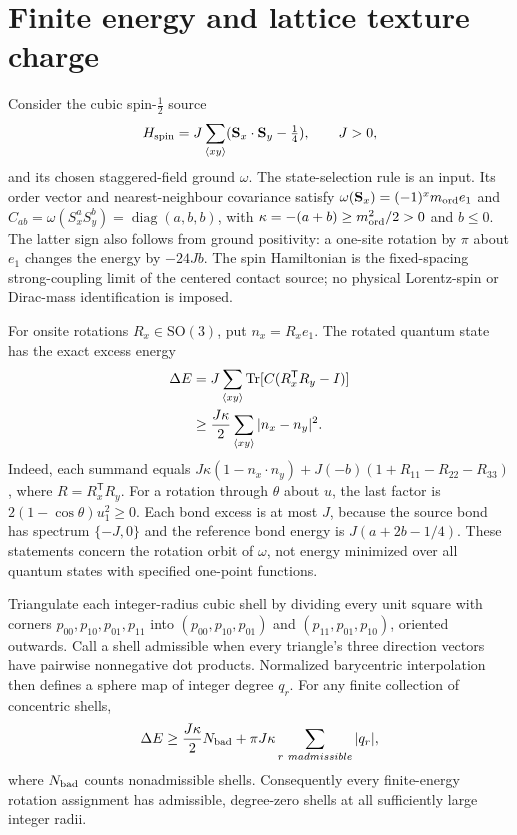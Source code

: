 \section{Finite energy and lattice texture charge}
\label{sec:lattice-texture-finite-energy}

Consider the cubic spin-$\tfrac12$ source
\[
 H_{\rm spin}=J\sum_{\langle xy\rangle}
 (\mathbf S_x\cdot\mathbf S_y-\tfrac14),\qquad J>0,
\]
and its chosen staggered-field ground $\omega$. The state-selection rule
is an input. Its order vector and nearest-neighbour covariance satisfy
$\omega(\mathbf S_x)=(-1)^x m_{\rm ord}e_1$ and
$C_{ab}=\omega(S_x^aS_y^b)=\operatorname{diag}(a,b,b)$, with
$\kappa=-(a+b)\geq m_{\rm ord}^2/2>0$ and $b\leq0$.
The latter sign also follows from ground positivity: a one-site rotation
by $\pi$ about $e_1$ changes the energy by $-24Jb$.
The spin Hamiltonian is the fixed-spacing strong-coupling limit of the
centered contact source; no physical Lorentz-spin or Dirac-mass
identification is imposed.

For onsite rotations $R_x\in\mathrm{SO}(3)$, put $n_x=R_xe_1$.
The rotated quantum state has the exact excess energy
\begin{align}
 \Delta E
 &=J\sum_{\langle xy\rangle}\operatorname{Tr}
       [C(R_x^{\mathsf T}R_y-I)] \notag\\
 &\geq \frac{J\kappa}{2}
       \sum_{\langle xy\rangle}|n_x-n_y|^2.
 \label{eq:lattice-texture-source-bound}
\end{align}
Indeed, each summand equals
$J\kappa(1-n_x\cdot n_y)+J(-b)(1+R_{11}-R_{22}-R_{33})$,
where $R=R_x^{\mathsf T}R_y$.
For a rotation through $\theta$ about $u$, the last factor is
$2(1-\cos\theta)u_1^2\geq0$.
Each bond excess is at most $J$, because the source bond has spectrum
$\{-J,0\}$ and the reference bond energy is $J(a+2b-1/4)$.
These statements concern the rotation orbit of $\omega$, not energy
minimized over all quantum states with specified one-point functions.

\begin{proposition}
\label{prop:lattice-texture-shell-charge}
Triangulate each integer-radius cubic shell by dividing every unit square
with corners $p_{00},p_{10},p_{01},p_{11}$ into
$(p_{00},p_{10},p_{01})$ and $(p_{11},p_{01},p_{10})$, oriented outwards.
Call a shell admissible when every triangle's three direction vectors
have pairwise nonnegative dot products. Normalized barycentric
interpolation then defines a sphere map of integer degree $q_r$.
For any finite collection of concentric shells,
\begin{equation}
 \Delta E\geq \frac{J\kappa}{2}N_{\rm bad}
       +\pi J\kappa\sum_{r\ {
m admissible}}|q_r|,
 \label{eq:lattice-texture-mixed-shell-bound}
\end{equation}
where $N_{\rm bad}$ counts nonadmissible shells.
Consequently every finite-energy rotation assignment has admissible,
degree-zero shells at all sufficiently large integer radii.
\end{proposition}

